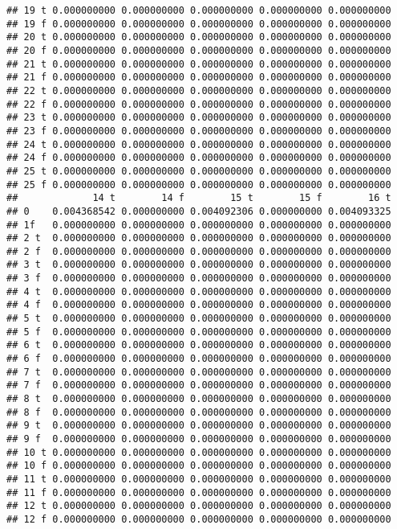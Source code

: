 \documentclass[]{article}
\begin{document}
\begin{verbatim}
## 19 t 0.000000000 0.000000000 0.000000000 0.000000000 0.000000000
## 19 f 0.000000000 0.000000000 0.000000000 0.000000000 0.000000000
## 20 t 0.000000000 0.000000000 0.000000000 0.000000000 0.000000000
## 20 f 0.000000000 0.000000000 0.000000000 0.000000000 0.000000000
## 21 t 0.000000000 0.000000000 0.000000000 0.000000000 0.000000000
## 21 f 0.000000000 0.000000000 0.000000000 0.000000000 0.000000000
## 22 t 0.000000000 0.000000000 0.000000000 0.000000000 0.000000000
## 22 f 0.000000000 0.000000000 0.000000000 0.000000000 0.000000000
## 23 t 0.000000000 0.000000000 0.000000000 0.000000000 0.000000000
## 23 f 0.000000000 0.000000000 0.000000000 0.000000000 0.000000000
## 24 t 0.000000000 0.000000000 0.000000000 0.000000000 0.000000000
## 24 f 0.000000000 0.000000000 0.000000000 0.000000000 0.000000000
## 25 t 0.000000000 0.000000000 0.000000000 0.000000000 0.000000000
## 25 f 0.000000000 0.000000000 0.000000000 0.000000000 0.000000000
##             14 t        14 f        15 t        15 f        16 t
## 0    0.004368542 0.000000000 0.004092306 0.000000000 0.004093325
## 1f   0.000000000 0.000000000 0.000000000 0.000000000 0.000000000
## 2 t  0.000000000 0.000000000 0.000000000 0.000000000 0.000000000
## 2 f  0.000000000 0.000000000 0.000000000 0.000000000 0.000000000
## 3 t  0.000000000 0.000000000 0.000000000 0.000000000 0.000000000
## 3 f  0.000000000 0.000000000 0.000000000 0.000000000 0.000000000
## 4 t  0.000000000 0.000000000 0.000000000 0.000000000 0.000000000
## 4 f  0.000000000 0.000000000 0.000000000 0.000000000 0.000000000
## 5 t  0.000000000 0.000000000 0.000000000 0.000000000 0.000000000
## 5 f  0.000000000 0.000000000 0.000000000 0.000000000 0.000000000
## 6 t  0.000000000 0.000000000 0.000000000 0.000000000 0.000000000
## 6 f  0.000000000 0.000000000 0.000000000 0.000000000 0.000000000
## 7 t  0.000000000 0.000000000 0.000000000 0.000000000 0.000000000
## 7 f  0.000000000 0.000000000 0.000000000 0.000000000 0.000000000
## 8 t  0.000000000 0.000000000 0.000000000 0.000000000 0.000000000
## 8 f  0.000000000 0.000000000 0.000000000 0.000000000 0.000000000
## 9 t  0.000000000 0.000000000 0.000000000 0.000000000 0.000000000
## 9 f  0.000000000 0.000000000 0.000000000 0.000000000 0.000000000
## 10 t 0.000000000 0.000000000 0.000000000 0.000000000 0.000000000
## 10 f 0.000000000 0.000000000 0.000000000 0.000000000 0.000000000
## 11 t 0.000000000 0.000000000 0.000000000 0.000000000 0.000000000
## 11 f 0.000000000 0.000000000 0.000000000 0.000000000 0.000000000
## 12 t 0.000000000 0.000000000 0.000000000 0.000000000 0.000000000
## 12 f 0.000000000 0.000000000 0.000000000 0.000000000 0.000000000

\end{verbatim}
\end{document}
